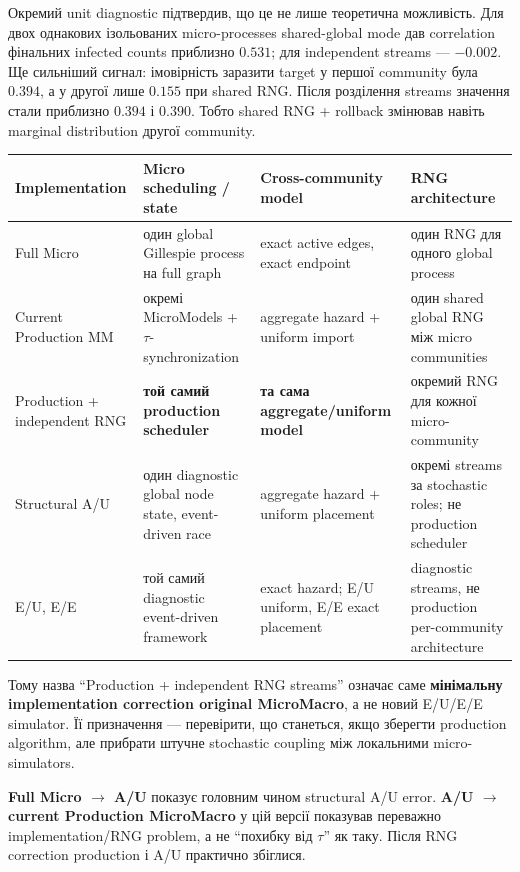 \documentclass[11pt,a4paper]{article}
\begin{document}
Окремий unit diagnostic підтвердив, що це не лише теоретична можливість. Для двох однакових ізольованих micro-processes shared-global mode дав correlation фінальних infected counts приблизно $0.531$; для independent streams --- $-0.002$. Ще сильніший сигнал: імовірність заразити target у першої community була $0.394$, а у другої лише $0.155$ при shared RNG. Після розділення streams значення стали приблизно $0.394$ і $0.390$. Тобто shared RNG + rollback змінював навіть marginal distribution другої community.

\begin{center}
\small
\begin{tabular}{p{31mm} p{42mm} p{42mm} p{42mm}}
\toprule
\textbf{Implementation} & \textbf{Micro scheduling / state} & \textbf{Cross-community model} & \textbf{RNG architecture}\\
\midrule
Full Micro & один global Gillespie process на full graph & exact active edges, exact endpoint & один RNG для одного global process\\
Current Production MM & окремі MicroModels + $\tau$-synchronization & aggregate hazard + uniform import & один shared global RNG між micro communities\\
Production + independent RNG & \textbf{той самий production scheduler} & \textbf{та сама aggregate/uniform model} & окремий RNG для кожної micro-community\\
Structural A/U & один diagnostic global node state, event-driven race & aggregate hazard + uniform placement & окремі streams за stochastic roles; не production scheduler\\
E/U, E/E & той самий diagnostic event-driven framework & exact hazard; E/U uniform, E/E exact placement & diagnostic streams, не production per-community architecture\\
\bottomrule
\end{tabular}
\end{center}

Тому назва ``Production + independent RNG streams'' означає саме \textbf{мінімальну implementation correction original MicroMacro}, а не новий E/U/E/E simulator. Її призначення --- перевірити, що станеться, якщо зберегти production algorithm, але прибрати штучне stochastic coupling між локальними micro-simulators.

\begin{tcolorbox}[colback=soft,colframe=macro,title=Як це читати]
\textbf{Full Micro $\to$ A/U} показує головним чином structural A/U error.\newline
\textbf{A/U $\to$ current Production MicroMacro} у цій версії показував переважно implementation/RNG problem, а не ``похибку від $\tau$'' як таку. Після RNG correction production і A/U практично збіглися.
\end{tcolorbox}
\end{document}
